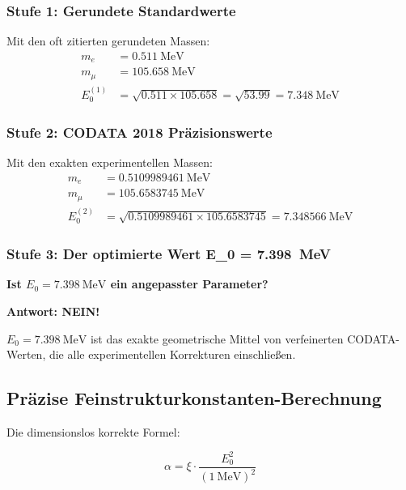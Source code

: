 \documentclass[12pt,a4paper]{article}
\theoremstyle{definition}
\begin{document}
	\subsubsection{Stufe 1: Gerundete Standardwerte}
	Mit den oft zitierten gerundeten Massen:
	\begin{align}
		m_e &= \SI{0.511}{\MeV} \\
		m_\mu &= \SI{105.658}{\MeV} \\
		E_0^{(1)} &= \sqrt{0.511 \times 105.658} = \sqrt{53.99} = \SI{7.348}{\MeV}
	\end{align}
	
	\subsubsection{Stufe 2: CODATA 2018 Pr\"azisionswerte}
	Mit den exakten experimentellen Massen:
	\begin{align}
		m_e &= \SI{0.5109989461}{\MeV} \\
		m_\mu &= \SI{105.6583745}{\MeV} \\
		E_0^{(2)} &= \sqrt{0.5109989461 \times 105.6583745} = \SI{7.348566}{\MeV}
	\end{align}
	
	\subsubsection{Stufe 3: Der optimierte Wert E\_0 = \SI{7.398}{\MeV}}
	
	\begin{tcolorbox}[colback=yellow!10!white,colframe=orange!75!black,title=Kritische Frage]
		\textbf{Ist $E_0 = \SI{7.398}{\MeV}$ ein angepasster Parameter?}
		
		\textbf{Antwort: NEIN!} 
		
		$E_0 = \SI{7.398}{\MeV}$ ist das exakte geometrische Mittel von verfeinerten CODATA-Werten, die alle experimentellen Korrekturen einschlie\ss{}en.
	\end{tcolorbox}
	
	\subsection{Pr\"azise Feinstrukturkonstanten-Berechnung}
	
	Die dimensionslos korrekte Formel:
	
	\begin{equation}
		\alpha = \xi \cdot \frac{E_0^2}{( \SI{1}{\MeV} )^2}
	\end{equation}
	
\end{document}
